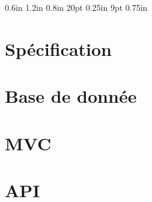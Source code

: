 \documentclass[12pt,oneside]{report}
\newcommand{\hsp}{\hspace{20pt}}
\begin{document}
\setmarginsrb{ 1.2in}   %
             { 0.6in}   %
             { 1.2in}   %
             { 0.8in}   %
             {  20pt}   %
             {0.25in}   %
             { 9pt}     %
             { 0.75in}  %



\titleformat{\chapter}[hang]{\Huge\bfseries}{\thechapter\hsp\textcolor{gray75}{|}\hsp}{0pt}{\Huge\bfseries}



\tableofcontents

\chapter{Spécification}
\label{chap:Spécification}

	\vspace{\baselineskip}
	

\chapter{Base de donnée}
\label{chap:Base de donnée}

	\vspace{\baselineskip}
	

\chapter{MVC}
\label{chap:MVC}

	\vspace{\baselineskip}
	

\chapter{API}
\label{chap:API}
\end{document}
